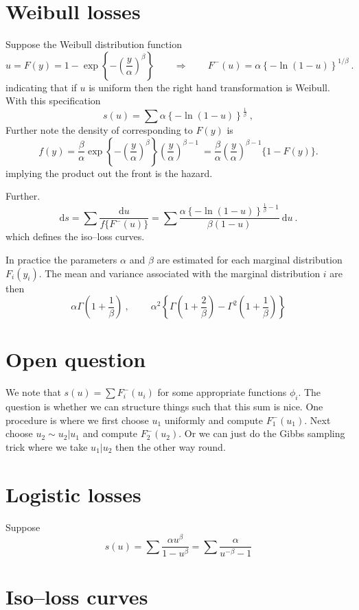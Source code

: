 \documentclass[a4paper,12pt]{article}
\newcommand{\de}{\mathrm{d}}
\begin{document}
\section{Weibull losses}

Suppose the Weibull distribution function
$$
u=F(y)=1-\exp\left\{-\left(\frac{y}{\alpha}\right)^\beta\right\}\qquad\Rightarrow\qquad
F^-(u) = \alpha\left\{-\ln(1-u)\right\}^{1/\beta}\ .
$$
indicating that if $u$ is uniform then the right hand transformation is Weibull.
With this specification
$$
s(u) = \sum\alpha\left\{-\ln(1-u)\right\}^{\frac{1}{\beta}}\ ,
$$
Further note the density of corresponding to $F(y)$ is
$$
f(y) = \frac{\beta}{\alpha} \exp\left\{-\left(\frac{y}{\alpha}\right)^\beta\right\}\left(\frac{y}{\alpha}\right)^{\beta-1}\ = \frac{\beta}{\alpha}\left(\frac{y}{\alpha}\right)^{\beta-1}\{1-F(y)\}.
$$
implying the product out the front is the hazard.


Further.
$$
\de s = \sum\frac{\de u}{f\{F^-(u)\}}= \sum \frac{\alpha\left\{-\ln(1-u)\right\}^{\frac{1}{\beta}-1}}{\beta(1-u)}\ \de u\ .
$$
which defines the iso--loss curves.

In practice the parameters $\alpha$ and $\beta$ are estimated for each marginal distribution $F_i(y_i)$.  The mean and variance associated with the marginal distribution $i$ are then
$$
\alpha\Gamma\left(1+\frac{1}{\beta}\right)\ , \
\qquad \alpha^2\left\{\Gamma\left(1+\frac{2}{\beta}\right)-\Gamma^2\left(1+\frac{1}{\beta}\right)\right\}
$$



\section{Open question}

We note that $s(u)=\sum F_i^-(u_i)$ for some appropriate functions $\phi_i$.  The question is whether we can structure things such that this sum is nice.   One procedure is where we first choose $u_1$ uniformly and compute $F_1^-(u_1)$.  Next choose $u_2\sim u_2|u_1$ and compute $F_2^-(u_2)$.  Or we can just do the Gibbs sampling trick where we take $u_1|u_2$ then the other way round.

\section{Logistic losses}

Suppose
$$
s(u) = \sum \frac{\alpha u^\beta}{1-u^\beta} = \sum\frac{\alpha}{u^{-\beta}-1}
$$

\section{Iso--loss curves}
\end{document}
